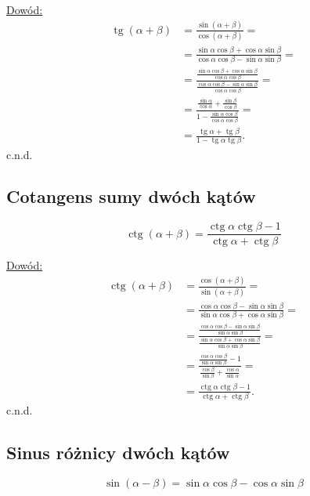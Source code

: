 \documentclass[12pt,a4paper,fleqn]{article}
\DeclareMathOperator{\tg}{tg}
\DeclareMathOperator{\ctg}{ctg}
\begin{document}
		\underline{Dowód:}\noindent
		\begin{align*}
			\tg (\alpha + \beta) &= \frac{\sin(\alpha + \beta)}{\cos(\alpha+\beta)} = \\
								 &= \frac{\sin\alpha\cos\beta + \cos\alpha\sin\beta}{\cos\alpha\cos\beta-\sin\alpha\sin\beta} =\\
								 &= \frac{\frac{\sin\alpha\cos\beta + \cos\alpha\sin\beta}{\cos\alpha\cos\beta}}
								 	{\frac{\cos\alpha\cos\beta-\sin\alpha\sin\beta}{\cos\alpha\cos\beta}} =\\
								 &=\frac{\frac{\sin\alpha}{\cos\alpha}+\frac{\sin\beta}{\cos\beta}}
								 	{1-\frac{\sin\alpha\cos\beta}{\cos\alpha\cos\beta}}=\\
								 &= \frac{\tg \alpha + \tg \beta}{1 - \tg \alpha \tg \beta}.
		\end{align*}
		c.n.d.
		
		\subsection{Cotangens sumy dwóch kątów}
		\begin{equation*}
			\ctg (\alpha + \beta) = \frac{\ctg\alpha\ctg\beta-1}{\ctg\alpha+\ctg\beta}
		\end{equation*}
		
		\underline{Dowód:}\noindent
		\begin{align*}
			\ctg (\alpha + \beta) &= \frac{\cos(\alpha+\beta)}{\sin(\alpha + \beta)} = \\
								  &= \frac{\cos\alpha\cos\beta-\sin\alpha\sin\beta}{\sin\alpha\cos\beta+\cos\alpha\sin\beta} =\\
								  &= \frac{\frac{\cos\alpha\cos\beta-\sin\alpha\sin\beta}{\sin\alpha\sin\beta}} {\frac{\sin\alpha\cos\beta+\cos\alpha\sin\beta}{\sin\alpha\sin \beta}} =\\
								  &=\frac{\frac{\cos\alpha\cos\beta}{\sin\alpha\sin\beta}-1}{\frac{\cos\beta}{\sin\beta}+\frac{\cos\alpha}{\sin\alpha}} = \\
								  &=\frac{\ctg\alpha\ctg\beta - 1}{\ctg\alpha+\ctg\beta}.
		\end{align*}
		c.n.d.
		
		\subsection{Sinus różnicy dwóch kątów}
		\begin{equation*}
			\sin(\alpha-\beta) = \sin\alpha\cos\beta-\cos\alpha\sin\beta
		\end{equation*}
		
\end{document}
